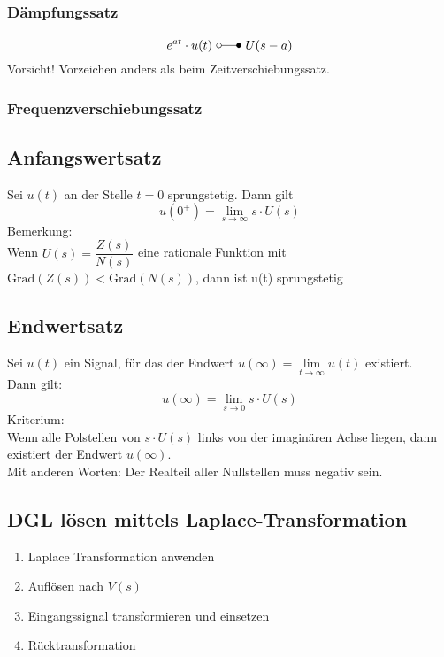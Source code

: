\subsubsection{Dämpfungssatz}
\[ 
    e^{at} \cdot u(t) ~ \laplace ~ U(s - a) 
\]
Vorsicht! Vorzeichen anders als beim Zeitverschiebungssatz.

\subsubsection{Frequenzverschiebungssatz}



\subsection{Anfangswertsatz}
Sei $u(t)$ an der Stelle $t = 0$ sprungstetig. Dann gilt
\[ 
    u(0^+) = \lim\limits_{s \to \infty} s \cdot U(s) 
\]
Bemerkung: \\
Wenn $U(s) = \dfrac{Z(s)}{N(s)}$ eine rationale Funktion mit
$\text{Grad}(Z(s)) < \text{Grad}(N(s))$, dann ist u(t) sprungstetig

\subsection{Endwertsatz }
Sei $u(t)$ ein Signal, für das der Endwert
$u(\infty) = \lim\limits_{t \to \infty} u(t)$ existiert. \\
Dann gilt:
\[ 
u(\infty) = \lim\limits_{s \to 0} s \cdot U(s) 
\]
Kriterium: \\
Wenn alle Polstellen von $s \cdot U(s)$ links von der imaginären Achse liegen,
dann existiert der Endwert $u(\infty)$. \\
Mit anderen Worten: Der Realteil aller Nullstellen muss negativ sein.

\subsection{DGL lösen mittels Laplace-Transformation}
\begin{enumerate}
    \item Laplace Transformation anwenden
    \item Auflösen nach $V(s)$
    \item Eingangssignal transformieren und einsetzen
    \item Rücktransformation
\end{enumerate}

